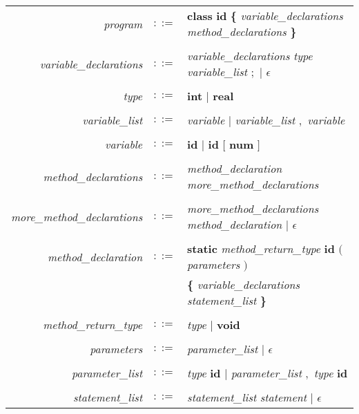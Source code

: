 \documentclass{article}
\begin{document}
\newcommand{\token}[1]
{ \textbf{#1} }

\newcommand{\nont}[1]
{ \emph{#1} }

\newcommand{\lnont}[1]
{ \\
\emph{#1} & $::=$ & 
}

\begin{tabular}{r l l}

	\lnont{program} \token{class} \token{id}  \token{\{}  \nont{variable\_declarations} \nont{method\_declarations} \token{\}} \\
	
	\lnont{variable\_declarations} \nont{variable\_declarations} \nont{type} \nont{variable\_list} \token{$;$} $|$ $\epsilon$ \\
	
	\lnont{type}  \token{int} $|$ \token{real} \\
	
	\lnont{variable\_list} \nont{variable} $|$ \nont{variable\_list} \token{$,$} \nont{variable} \\

	\lnont{variable} \token{id} $|$ \token{id} \token{$[$} \token{num} \token{$]$} \\ 

	\lnont{method\_declarations}  \nont{method\_declaration} \nont{more\_method\_declarations} \\
	
	\lnont{more\_method\_declarations} \nont{more\_method\_declarations} \nont{method\_declaration} $|$ $\epsilon$ \\

	\lnont{method\_declaration} \token{static} \nont{method\_return\_type} \token{id} \token{$($} \nont{parameters} \token{$)$} \\
	& &  \token{\{}  \nont{variable\_declarations} \nont{statement\_list} \token{\}} \\

	\lnont{method\_return\_type} \nont{type} $|$ \token{void} \\

	\lnont{parameters} \nont{parameter\_list} $|$ $\epsilon$ \\ 

	\lnont{parameter\_list} \nont{type} \token{id} $|$ \nont{parameter\_list} \token{$,$} \nont{type} \token{id} \\
	
	\lnont{statement\_list} \nont{statement\_list} \nont{statement} $|$ $\epsilon$ \\


\end{tabular}
\end{document}

